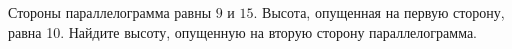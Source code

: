 \begin{ex}
	\begin{condition}
		 Стороны параллелограмма равны \( 9 \) и \( 15 \). Высота, опущенная на первую сторону, равна 10. Найдите высоту, опущенную на вторую сторону параллелограмма.
	\end{condition}
\end{ex}